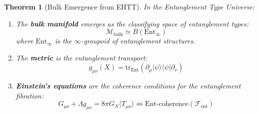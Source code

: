 \documentclass[12pt,a4paper]{article}
\newtheorem{theorem}{Theorem}[section]
\begin{document}
\begin{theorem}[Bulk Emergence from EHTT]\label{thm:ehtt-bulk}
In the Entanglement Type Universe:
\begin{enumerate}
    \item The \textbf{bulk manifold} emerges as the classifying space of entanglement types:
    \begin{equation}
    \mathcal{M}_{\text{bulk}} \simeq B(\text{Ent}_\infty)
    \end{equation}
    where $\text{Ent}_\infty$ is the $\infty$-groupoid of entanglement structures.
    
    \item The \textbf{metric} is the entanglement transport:
    \begin{equation}
    g_{\mu\nu}(X) = \text{tr}_{\text{Ent}}(\partial_\mu |\psi\rangle \langle\psi| \partial_\nu)
    \end{equation}
    
    \item \textbf{Einstein's equations} are the coherence conditions for the entanglement fibration:
    \begin{equation}
    G_{\mu\nu} + \Lambda g_{\mu\nu} = 8\pi G_N \langle T_{\mu\nu} \rangle \iff \text{Ent-coherence}(\mathcal{F}_{\text{ent}})
    \end{equation}
\end{enumerate}
\end{theorem}
\end{document}
